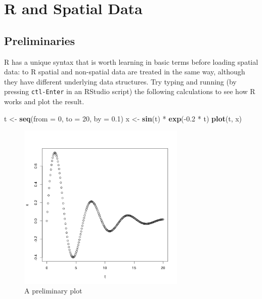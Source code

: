 \documentclass[]{article}
\newenvironment{Shaded}{}{}
\newcommand{\KeywordTok}[1]{\textcolor[rgb]{0.00,0.44,0.13}{\textbf{{#1}}}}
\newcommand{\DataTypeTok}[1]{\textcolor[rgb]{0.56,0.13,0.00}{{#1}}}
\newcommand{\DecValTok}[1]{\textcolor[rgb]{0.25,0.63,0.44}{{#1}}}
\newcommand{\FloatTok}[1]{\textcolor[rgb]{0.25,0.63,0.44}{{#1}}}
\newcommand{\NormalTok}[1]{{#1}}
\let\Oldincludegraphics\includegraphics
\renewcommand{\includegraphics}[1]{\Oldincludegraphics[width=8cm]{#1}}
\begin{document}
\section{R and Spatial Data}

\subsection{Preliminaries}

R has a unique syntax that is worth learning in basic terms before
loading spatial data: to R spatial and non-spatial data are treated in
the same way, although they have different underlying data structures.
Try typing and running (by pressing \texttt{ctl-Enter} in an RStudio
script) the following calculations to see how R works and plot the
result.

\begin{Shaded}
\begin{Highlighting}[]
\NormalTok{t <- }\KeywordTok{seq}\NormalTok{(}\DataTypeTok{from =} \DecValTok{0}\NormalTok{, }\DataTypeTok{to =} \DecValTok{20}\NormalTok{, }\DataTypeTok{by =} \FloatTok{0.1}\NormalTok{)}
\NormalTok{x <- }\KeywordTok{sin}\NormalTok{(t) * }\KeywordTok{exp}\NormalTok{(-}\FloatTok{0.2} \NormalTok{* t)}
\KeywordTok{plot}\NormalTok{(t, x)}
\end{Highlighting}
\end{Shaded}
\begin{figure}[htbp]
\centering
\includegraphics{figure/A_preliminary_plot.png}
\caption{A preliminary plot}
\end{figure}
\end{document}
